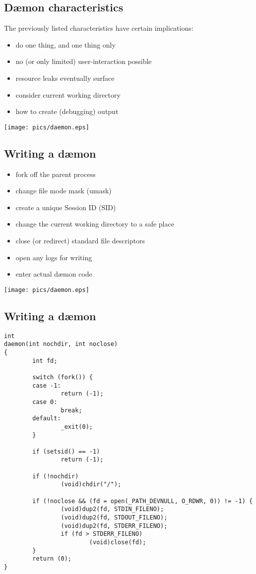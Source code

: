 \documentclass[xga]{xdvislides}
\begin{document}
\subsection{D\ae mon characteristics}
The previously listed characteristics have certain implications:
\\

\begin{itemize}
	\item do one thing, and one thing only
	\item no (or only limited) user-interaction possible
	\item resource leaks eventually surface
	\item consider current working directory
	\item how to create (debugging) output
\end{itemize}

\vfill
\hfill\texttt{[image: pics/daemon.eps]} \\

\subsection{Writing a d\ae mon}
\begin{itemize}
	\item fork off the parent process
	\item change file mode mask (umask)
	\item create a unique Session ID (SID)
	\item change the current working directory to a safe place
	\item close (or redirect) standard file descriptors
	\item open any logs for writing
	\item enter actual d\ae mon code
\end{itemize}

\vfill
\hfill\texttt{[image: pics/daemon.eps]} \\

\subsection{Writing a d\ae mon}
\small
\begin{verbatim}
int
daemon(int nochdir, int noclose)
{
        int fd;

        switch (fork()) {
        case -1:
                return (-1);
        case 0:
                break;
        default:
                _exit(0);
        }

        if (setsid() == -1)
                return (-1);

        if (!nochdir)
                (void)chdir("/");

        if (!noclose && (fd = open(_PATH_DEVNULL, O_RDWR, 0)) != -1) {
                (void)dup2(fd, STDIN_FILENO);
                (void)dup2(fd, STDOUT_FILENO);
                (void)dup2(fd, STDERR_FILENO);
                if (fd > STDERR_FILENO)
                        (void)close(fd);
        }
        return (0);
}
\end{verbatim}
\Normalsize
\end{document}
